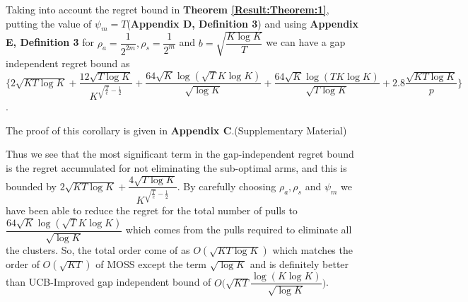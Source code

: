 \begin{corollary}
\label{Result:Corollary:1}
Taking into account the regret bound in \textbf{Theorem \ref{Result:Theorem:1}}, putting the value of $\psi_{m}=T$(\textbf{Appendix D, Definition 3}) and using \textbf{Appendix E, Definition 3} for $\rho_{a}=\dfrac{1}{2^{2m}},\rho_{s}=\dfrac{1}{2^{m}} $ and $b=\sqrt{\dfrac{K\log K}{T}}$ we can have a gap independent regret bound as $\bigg\lbrace 2\sqrt{KT\log K} + \dfrac{12\sqrt{T\log K}}{K^{\sqrt{\frac{T}{e}}-\frac{1}{2}}} + \dfrac{64\sqrt{K}\log{(\sqrt{T}K\log K)}}{\sqrt{\log K}} + \dfrac{64\sqrt{K}\log{(TK\log K)}}{\sqrt{T\log K}} + 2.8\dfrac{\sqrt{KT\log K}}{p} \bigg\rbrace$.
\end{corollary}


	The proof of this corollary is given in \textbf{Appendix C}.(Supplementary Material)

\begin{remark}
\label{Result:Rem:3}
	Thus we see that the most significant term in the gap-independent regret bound is the regret accumulated for not eliminating the sub-optimal arms, and this is bounded by $2\sqrt{KT\log K} + \dfrac{4\sqrt{T\log K}}{K^{\sqrt{\frac{T}{e}}-\frac{1}{2}}}$. By carefully choosing $\rho_{a},\rho_{s}$ and $\psi_{m}$ we have been able to reduce the regret for the total number of pulls to $\dfrac{64\sqrt{K}\log{(\sqrt{T}K\log K)}}{\sqrt{\log K}}$ which comes from the pulls required to eliminate all the clusters. So, the total order come of as $O(\sqrt{KT\log K})$ which matches the order of $O(\sqrt{KT})$ of MOSS except the term $\sqrt{\log K}$ and is definitely better than UCB-Improved gap independent bound of $O\big(\sqrt{KT}\dfrac{\log(K\log K)}{\sqrt{\log K}}\big)$.
\end{remark}

